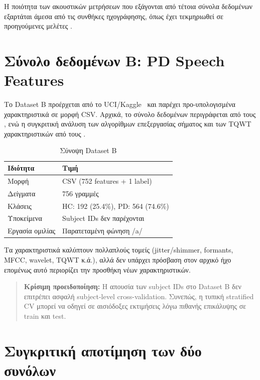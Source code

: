 Η ποιότητα των ακουστικών μετρήσεων που εξάγονται από τέτοια σύνολα δεδομένων εξαρτάται άμεσα από τις συνθήκες ηχογράφησης, όπως έχει τεκμηριωθεί σε προηγούμενες μελέτες \citep{rusz2011quantitative}.

\section{Σύνολο δεδομένων Β: PD Speech Features}

Το Dataset B προέρχεται από το UCI/Kaggle~\cite{pd_speech_features_kaggle} και παρέχει προ-υπολογισμένα χαρακτηριστικά σε μορφή CSV. 
Αρχικά, το σύνολο δεδομένων περιγράφεται από τους \citet{sakar2013collection}, ενώ η συγκριτική ανάλυση των αλγορίθμων επεξεργασίας σήματος και των TQWT χαρακτηριστικών από τους \citet{sakar2019comparative}.

\begin{table}[H]
\centering
\begin{tabular}{@{}ll@{}}
\toprule
\textbf{Ιδιότητα} & \textbf{Τιμή} \\
\midrule
Μορφή & CSV (752 features + 1 label) \\
Δείγματα & 756 γραμμές \\
Κλάσεις & HC: 192 (25.4\%), PD: 564 (74.6\%) \\
Υποκείμενα & Subject IDs δεν παρέχονται \\
Εργασία ομιλίας & Παρατεταμένη φώνηση /a/ \\
\bottomrule
\end{tabular}
\caption{Σύνοψη Dataset B}
\label{tab:dataset-b-summary}
\end{table}

Τα χαρακτηριστικά καλύπτουν πολλαπλούς τομείς (\gls{jitter}/\gls{shimmer}, formants, MFCC, wavelet, TQWT κ.ά.), 
αλλά δεν υπάρχει πρόσβαση στον αρχικό ήχο επομένως αυτό περιορίζει την προσθήκη νέων χαρακτηριστικών.

\begin{quote}
\textbf{Κρίσιμη προειδοποίηση:} Η απουσία των subject IDs στο Dataset B δεν επιτρέπει ασφαλή subject-level cross-validation. Συνεπώς, η τυπική stratified CV μπορεί να οδηγεί σε αισιόδοξες εκτιμήσεις λόγω πιθανής επικάλυψης σε train και test.
\end{quote}

\section{Συγκριτική αποτίμηση των δύο συνόλων}

